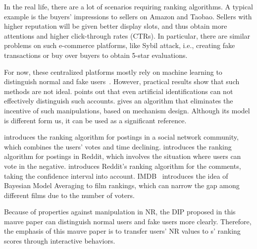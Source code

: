 In the real life, there are a lot of scenarios requiring ranking algorithms. A
typical example is the buyers' impressions to sellers on
Amazon and Taobao. Sellers with higher reputation will be given better display
slots, and thus obtain more attentions and higher click-through rates (CTRs). In
particular, there are similar problems on such e-commerce platforms, like Sybil attack, i.e., creating fake transactions or buy over buyers to obtain 5-star evaluations.

For now, these centralized platforms mostly rely on machine learning to
distinguish normal and fake
users~\cite{mukherjee2013spotting,jindal2008opinion,yoo2009comparison}.
However, practical results show that such methods are not ideal.
\cite{ott2011finding} points out that even artificial identifications can not effectively distinguish such accounts.  \cite{cai2016mechanism} gives an
algorithm that eliminates the incentive of such manipulations, based on
mechanism design. Although its model is different form us, it can be used as a significant reference.

\cite{salihefendic2010hacker} introduces the ranking algorithm for postings in
a social network community, which combines the users' votes and time declining.
\cite{salihefendic2010reddit} introduces the ranking algorithm for postings in Reddit, which involves the situation where users can vote in the negative.
\cite{miller2009how} introduces Reddit's ranking algorithm for the comments, taking the confidence interval into account.
IMDB~\cite{IMDB} introduces the idea of Bayesian Model Averaging to film
rankings, which can narrow the gap among different films due to the number of voters.

Because of properties against manipulation in NR, the DIP proposed in this mauve paper can distinguish normal users and fake users more clearly. Therefore, the emphasis of this mauve paper is to transfer users' NR values to {\dapp}s' ranking scores through interactive behaviors.

